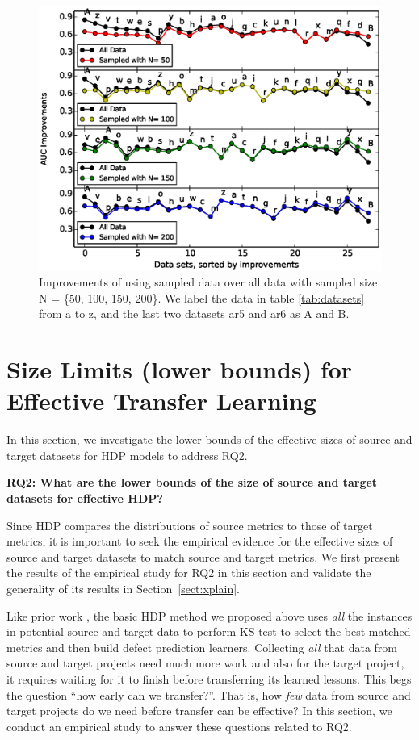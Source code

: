 
\begin{figure}[t]
	\centering
	\includegraphics[width=.66\linewidth]{Figures/raleigh/sample_random.eps}
	\caption{Improvements of using sampled data over all data with sampled size N = \{50, 100, 150, 200\}. We label the data in table \ref{tab:datasets} from a to z, and the last two datasets ar5 and ar6 as A and B.}
	\label{fig:small_data}
\end{figure}

\section{Size Limits (lower bounds) for Effective Transfer Learning}
\label{sec:sizelimit}

In this section, we investigate the lower bounds of the effective sizes of source and target datasets for HDP models to address RQ2.

{\bf RQ2: What are the  lower  bounds  of  the  size  of source and target  datasets  for  effective HDP?}

Since HDP compares the distributions of source metrics to those of target metrics, it is important to seek the empirical evidence for the effective sizes of source and target datasets to match source and target metrics. We first present the results of the empirical study for RQ2 in this section and validate the generality of its results in Section~\ref{sect:xplain}.

Like prior work \cite{Nam13,
  Ma12, Rahman12, Ryu14,
  Zhang14}, the basic HDP method we
proposed above uses {\em all} the instances in potential source and target data to
perform KS-test to select the best matched metrics and then build
defect prediction learners.
Collecting {\em all} that data from source and target projects need much more work and also
for the target project, it requires waiting for it to finish before
transferring its learned lessons. This begs the question ``how early can we transfer?''.
That is, how {\em few} data from source and target projects do we need before transfer can be effective? In this section, we conduct an empirical study to answer these questions related to RQ2.

